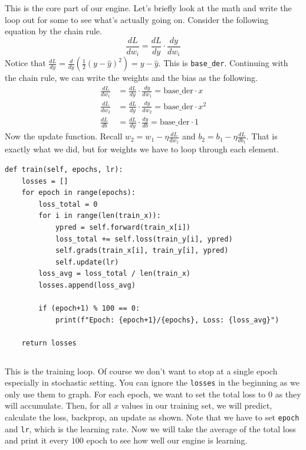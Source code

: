 \documentclass[../../../main.tex]{subfiles}
\begin{document}
This is the core part of our engine. Let's briefly look at the math
and write the loop out for some to see what's actually going on.
Consider the following equation by the chain rule.
\[
\frac{dL}{dw_i} = \frac{dL}{dy} \cdot \frac{dy}{dw_i}
\]
Notice that $\frac{dL}{dy} = \frac{d}{dy} (\frac{1}{2} (y -
\hat{y})^2) = y - \hat{y}$. This is \verb|base_der|. Continuing with
the chain rule, we can write the weights and the bias as the
following.
\begin{align*}
    \frac{dL}{dw_1}
    &= \frac{dL}{dy} \cdot \frac{dy}{dw_1}
    = \text{base\_der} \cdot x \\
    \frac{dL}{dw_2}
    &= \frac{dL}{dy} \cdot \frac{dy}{dw_2}
    = \text{base\_der} \cdot x^2 \\
    \frac{dL}{db}
    &= \frac{dL}{dy} \cdot \frac{dy}{db}
    = \text{base\_der} \cdot 1
\end{align*}
Now the update function. Recall $w_2 = w_1 - \eta \frac{dL}{dw_1}$
and $b_2 = b_1 - \eta \frac{dL}{db_1}$. That is exactly what we did,
but for weights we have to loop through each element.

\begin{jupyter}
\begin{lstlisting}[style=jin]
def train(self, epochs, lr):
    losses = []
    for epoch in range(epochs):
        loss_total = 0
        for i in range(len(train_x)):
            ypred = self.forward(train_x[i])
            loss_total += self.loss(train_y[i], ypred)
            self.grads(train_x[i], train_y[i], ypred)
            self.update(lr)
        loss_avg = loss_total / len(train_x)
        losses.append(loss_avg)

        if (epoch+1) % 100 == 0:
            print(f"Epoch: {epoch+1}/{epochs}, Loss: {loss_avg}")
        
    return losses
\end{lstlisting}
\begin{lstlisting}[style=jout]
\end{lstlisting}
\end{jupyter}

This is the training loop. Of course we don't want to stop at a
single epoch especially in stochastic setting. You can ignore
the \verb|losses| in the beginning as we only use them to graph.
For each epoch, we want to set the total loss to $0$ as they will
accumulate. Then, for all $x$ values in our training set, we will
predict, calculate the loss, backprop, an update as shown. Note
that we have to set \verb|epoch| and \verb|lr|, which is the
learning rate. Now we will take the average of the total loss and
print it every $100$ epoch to see how well our engine is learning.
\end{document}
